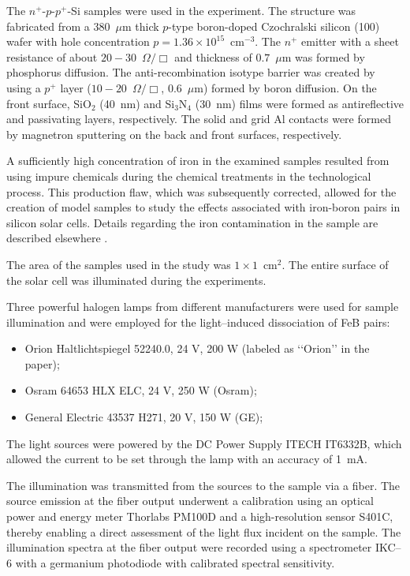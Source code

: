 \documentclass{WileyMSP-template}
\begin{document}
The $n^+$-$p$-$p^+$-Si samples were used in the experiment.
The structure was fabricated from a 380~$\mu$m thick $p$-type boron-doped
Czochralski silicon (100) wafer with hole concentration $p=1.36\times10^{15}$~cm$^{-3}$.
The $n^+$ emitter with a sheet resistance of about $20-30$~$\Omega/\Box$
and  thickness of $0.7$~$\mu$m was formed by phosphorus diffusion.
The anti-recombination isotype barrier was created by using a $p^+$
layer ($10-20$~$\Omega/\Box$, $0.6$~$\mu$m) formed by boron diffusion.
On the front surface, SiO$_2$ (40~nm) and Si$_3$N$_4$ (30~nm) films were formed as antireflective and passivating layers, respectively.
The solid and grid Al contacts were formed by magnetron sputtering on the back and front surfaces, respectively.

A sufficiently high concentration of iron in the examined samples resulted from using impure chemicals during the chemical treatments in the technological process.
This production flaw, which was subsequently corrected, allowed for the creation of model samples to study the effects associated with iron-boron pairs in silicon solar cells.
Details regarding the iron contamination in the sample are described elsewhere \cite{Olikh2021JAP}.

The area of the samples used in the study was $1\times1$~cm$^2$.
The entire surface of the solar cell was illuminated during the experiments.

Three powerful halogen lamps from different manufacturers were used for sample illumination and were employed for the light--induced dissociation of FeB pairs:
\begin{itemize}
  \item Orion Haltlichtspiegel 52240.0, 24 V, 200 W (labeled as ‘‘Orion’’ in the paper);
  \item Osram 64653 HLX ELC, 24 V, 250 W (Osram);
  \item General Electric 43537 H271, 20 V, 150 W (GE);
\end{itemize}
The light sources were powered by the DC Power Supply ITECH IT6332B,
which allowed the current to be set through the lamp with an accuracy of 1~mA.

The illumination was transmitted from the sources to the sample via a fiber.
The source emission at the fiber output underwent a calibration using an optical power and energy meter Thorlabs PM100D and a high-resolution sensor S401C,
thereby enabling a direct assessment of the light flux incident on the sample.
The illumination spectra at the fiber output were recorded using a spectrometer IKC--6 with a germanium photodiode with calibrated spectral sensitivity.
\end{document}
